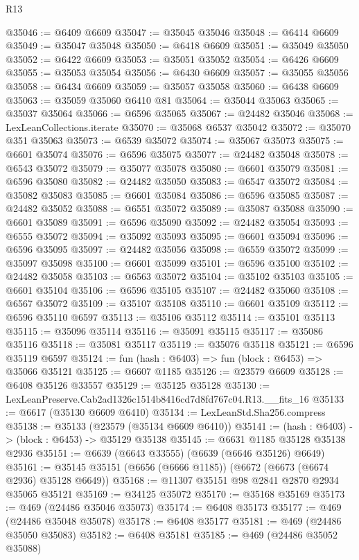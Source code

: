\begin{lexlean}{R13}
\begin{coremodule}
@35046 := @6409 @6609
@35047 := @35045 @35046
@35048 := @6414 @6609
@35049 := @35047 @35048
@35050 := @6418 @6609
@35051 := @35049 @35050
@35052 := @6422 @6609
@35053 := @35051 @35052
@35054 := @6426 @6609
@35055 := @35053 @35054
@35056 := @6430 @6609
@35057 := @35055 @35056
@35058 := @6434 @6609
@35059 := @35057 @35058
@35060 := @6438 @6609
@35063 := @35059 @35060 @6410 @81
@35064 := @35044 @35063
@35065 := @35037 @35064
@35066 := @6596 @35065
@35067 := @24482 @35046
@35068 := LexLeanCollections.iterate
@35070 := @35068 @6537 @35042
@35072 := @35070 @351 @35063
@35073 := @6539 @35072
@35074 := @35067 @35073
@35075 := @6601 @35074
@35076 := @6596 @35075
@35077 := @24482 @35048
@35078 := @6543 @35072
@35079 := @35077 @35078
@35080 := @6601 @35079
@35081 := @6596 @35080
@35082 := @24482 @35050
@35083 := @6547 @35072
@35084 := @35082 @35083
@35085 := @6601 @35084
@35086 := @6596 @35085
@35087 := @24482 @35052
@35088 := @6551 @35072
@35089 := @35087 @35088
@35090 := @6601 @35089
@35091 := @6596 @35090
@35092 := @24482 @35054
@35093 := @6555 @35072
@35094 := @35092 @35093
@35095 := @6601 @35094
@35096 := @6596 @35095
@35097 := @24482 @35056
@35098 := @6559 @35072
@35099 := @35097 @35098
@35100 := @6601 @35099
@35101 := @6596 @35100
@35102 := @24482 @35058
@35103 := @6563 @35072
@35104 := @35102 @35103
@35105 := @6601 @35104
@35106 := @6596 @35105
@35107 := @24482 @35060
@35108 := @6567 @35072
@35109 := @35107 @35108
@35110 := @6601 @35109
@35112 := @6596 @35110 @6597
@35113 := @35106 @35112
@35114 := @35101 @35113
@35115 := @35096 @35114
@35116 := @35091 @35115
@35117 := @35086 @35116
@35118 := @35081 @35117
@35119 := @35076 @35118
@35121 := @6596 @35119 @6597
@35124 := fun (hash : @6403) => fun (block : @6453) => @35066 @35121
@35125 := @6607 @1185
@35126 := @23579 @6609
@35128 := @6408 @35126 @33557
@35129 := @35125 @35128
@35130 := LexLeanPreserve.Cab2ad1326c1514b8416cd7d8fd767c04.R13.__fits_16
@35133 := @6617 (@35130 @6609 @6410)
@35134 := LexLeanStd.Sha256.compress
@35138 := @35133 (@23579 (@35134 @6609 @6410))
@35141 := (hash : @6403) -> (block : @6453) -> @35129 @35138
@35145 := @6631 @1185 @35128 @35138 @2936
@35151 := @6639 (@6643 @33555) (@6639 (@6646 @35126) @6649)
@35161 := @35145 @35151 (@6656 (@6666 @1185)) (@6672 (@6673 (@6674 @2936) @35128 @6649))
@35168 := @11307 @35151 @98 @2841 @2870 @2934 @35065 @35121
@35169 := @34125 @35072
@35170 := @35168 @35169
@35173 := @469 (@24486 @35046 @35073)
@35174 := @6408 @35173
@35177 := @469 (@24486 @35048 @35078)
@35178 := @6408 @35177
@35181 := @469 (@24486 @35050 @35083)
@35182 := @6408 @35181
@35185 := @469 (@24486 @35052 @35088)

\end{coremodule}
\end{lexlean}
